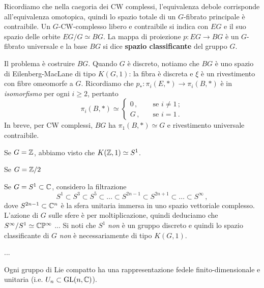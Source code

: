 Ricordiamo che nella caegoria dei CW complessi, l'equivalenza debole
corrisponde all'equivalenza omotopica, quindi lo spazio totale
di un $G$-fibrato principale è contraibile.
Un $G$-CW-complesso libero e contraibile si indica con $EG$
e il suo spazio delle orbite $EG/G \simeq BG$.
La mappa di proiezione $p:EG \to BG$ è un $G$-fibrato universale
e la base $BG$ si dice \textbf{spazio classificante} del gruppo $G$.


Il problema è costruire $BG$.
Quando $G$ è discreto, notiamo che $BG$ è uno spazio
di Eilenberg-MacLane di tipo $K(G,1)$:
la fibra è discreta e $\xi$ è un rivestimento con fibre omeomorfe a $G$.
Ricordiamo che $p_{*} : \pi_{i}(E,\ast) \to \pi_{i}(B,\ast)$
è in \emph{isomorfismo} per ogni $i \ge 2$, pertanto
\begin{equation*}
	\pi_{i}(B,\ast) \simeq 
	\begin{cases}
		0\,, \quad &\text{se }i \ne 1\,; \\
		G\,, \quad &\text{se } i = 1\,.
	\end{cases}
\end{equation*}
In breve, per CW complessi, $BG$ ha $\pi_{1}(B,\ast) \simeq G$ e rivestimento universale contraibile.

\begin{ex}
	\begin{rmnumerate}
		\item Se $G={\mathbb Z}$, abbiamo visto che $K({\mathbb Z},1) \simeq S^{1}$.
		
		\item Se $G = {\mathbb Z}/2$
		
		\item Se $G = S^{1} \subset \mathbb{C}$, considero la filtrazione
		\begin{equation*}
			S^{1} \subset S^{3} \subset S^{5} \subset \dots 
			\subset S^{2n-1} \subset S^{2n+1} \subset
			\dots \subset S^{\infty}\,,
		\end{equation*}
		dove $S^{2n-1} \subset \mathbb{C}^{n}$ è la sfera unitaria immersa in uno spazio vettoriale complesso.
		L'azione di $G$ sulle sfere è per moltiplicazione, quindi deduciamo che
		$S^{\infty} / S^{1} \simeq \mathbb{C}\mathbb{P}^{\infty}$ ...
		Si noti che $S^{1}$ \emph{non} è un gruppo discreto e 
		quindi lo spazio classificante di $G$ \emph{non} è necessariamente 
		di tipo $K(G,1)$.
	\end{rmnumerate}
\end{ex}

...

\begin{thm}\label{Peter-Weyl}
	Ogni gruppo di Lie compatto ha una rappresentazione fedele finito-dimensionale
	e unitaria (i.e. $U_{n} \subset \mathrm{GL}(n,\mathbb{C})$).
\end{thm}

